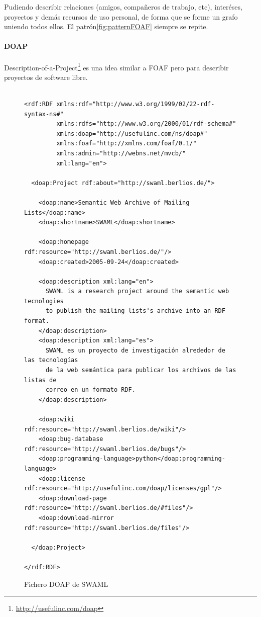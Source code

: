 Pudiendo describir relaciones (amigos, compañeros de trabajo, etc), interéses,
proyectos y demás recursos de uso personal, de forma que se forme un grafo 
uniendo todos ellos. El patrón\ref{fig:patternFOAF} siempre se repite.

\paragraph{DOAP}

Description-of-a-Project\footnote{\url{http://usefulinc.com/doap}} es una idea 
similar a FOAF pero para describir proyectos de software libre.

\begin{figure}[ht]
\begin{verbatim}

<rdf:RDF xmlns:rdf="http://www.w3.org/1999/02/22-rdf-syntax-ns#" 
         xmlns:rdfs="http://www.w3.org/2000/01/rdf-schema#" 
         xmlns:doap="http://usefulinc.com/ns/doap#" 
         xmlns:foaf="http://xmlns.com/foaf/0.1/" 
         xmlns:admin="http://webns.net/mvcb/" 
         xml:lang="en">

  <doap:Project rdf:about="http://swaml.berlios.de/">

    <doap:name>Semantic Web Archive of Mailing Lists</doap:name>
    <doap:shortname>SWAML</doap:shortname>

    <doap:homepage rdf:resource="http://swaml.berlios.de/"/>
    <doap:created>2005-09-24</doap:created>

    <doap:description xml:lang="en">
      SWAML is a research project around the semantic web tecnologies 
      to publish the mailing lists's archive into an RDF format.
    </doap:description>
    <doap:description xml:lang="es">
      SWAML es un proyecto de investigación alrededor de las tecnologías 
      de la web semántica para publicar los archivos de las listas de 
      correo en un formato RDF.
    </doap:description>

    <doap:wiki rdf:resource="http://swaml.berlios.de/wiki"/>
    <doap:bug-database rdf:resource="http://swaml.berlios.de/bugs"/>
    <doap:programming-language>python</doap:programming-language>
    <doap:license rdf:resource="http://usefulinc.com/doap/licenses/gpl"/>
    <doap:download-page rdf:resource="http://swaml.berlios.de/#files"/>
    <doap:download-mirror rdf:resource="http://swaml.berlios.de/files"/>

  </doap:Project>

</rdf:RDF>
\end{verbatim}
	\caption{Fichero DOAP de SWAML}
	\label{fig:ejemplo.doap}
\end{figure}

